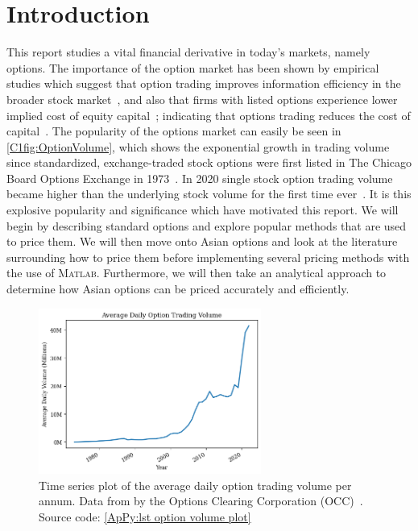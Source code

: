 \chapter{Introduction}
This report studies a vital financial derivative in today's markets, namely options. The importance of the option market has been shown by empirical studies which suggest that option trading improves information efficiency in the broader stock market~\cite{PanInfoEffic,li2021effect}, and also that firms with listed options experience lower implied cost of equity capital~\cite{naikerLowEquity}; indicating that options trading reduces the cost of capital~\cite{li2021effect}. The popularity of the options market can easily be seen in \autoref{C1fig:OptionVolume}, which shows the exponential growth in trading volume since standardized, exchange-traded stock options were first listed in The Chicago Board Options Exchange in 1973~\cite{markham2002financial}. In 2020 single stock option trading volume became higher than the underlying stock volume for the first time ever~\cite{yahooOptions}. 
\nline{}
It is this explosive popularity and significance which have motivated this report. We will begin by describing standard options and explore popular methods that are used to price them. We will then move onto Asian options and look at the literature surrounding how to price them before implementing several pricing methods with the use of \textsc{Matlab}. Furthermore, we will then take an analytical approach to determine how Asian options can be priced accurately and efficiently.

\begin{figure}[H]
    \centering
    \includegraphics[width=0.65\textwidth]{Chapters/C1/plots/OptionVolume.png}
    \caption{Time series plot of the average daily option trading volume per annum. Data from by the Options Clearing Corporation (OCC)~\cite{THEOCC}. Source code: \autoref{ApPy:lst option volume plot}}\label{C1fig:SymRw}
\end{figure}

